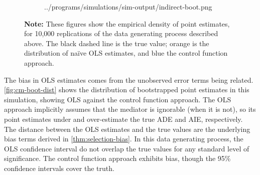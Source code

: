 \begin{figure}[h!]
\begin{subfigure}[c]{0.475\textwidth}
{            ../programs/simulations/sim-output/indirect-boot.png}
    \end{subfigure}
    \label{fig:cm-boot-dist}
    \justify
    \footnotesize    
    \textbf{Note:}
    These figures show the empirical density of point estimates, for 10,000 replications of the data generating process described above.
    The black dashed line is the true value;
    orange is the distribution of na\"ive OLS estimates, and blue the control function approach.
\end{figure}

The bias in OLS estimates comes from the unobserved error terms being related.
\autoref{fig:cm-boot-dist} shows the distribution of bootstrapped point estimates in this simulation, showing OLS against the control function approach.
The OLS approach implicitly assumes that the mediator is ignorable (when it is not), so its point estimates under and over-estimate the true ADE and AIE, respectively.
The distance between the OLS estimates and the true values are the underlying bias terms derived in \autoref{thm:selection-bias}.
In this data generating process, the OLS confidence interval do not overlap the true values for any standard level of significance.
The control function approach exhibits bias, though the 95\% confidence intervals cover the truth.

